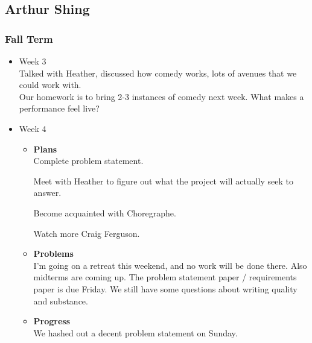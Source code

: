\subsection{Arthur Shing}
	\subsubsection{Fall Term}
	\begin{itemize}

		\item{Week 3} \\
		Talked with Heather, discussed how comedy works, lots of avenues that we could work with.\\
		Our homework is to bring 2-3 instances of comedy next week.
		What makes a performance feel live?
		\item{Week 4}
			\begin{itemize}
				\item \textbf{Plans} \\
				Complete problem statement.

Meet with Heather to figure out what the project will actually seek to answer.

Become acquainted with Choregraphe.

Watch more Craig Ferguson.
				\item \textbf{Problems} \\
I'm going on a retreat this weekend, and no work will be done there. Also midterms are coming up.
The problem statement paper / requirements paper is due Friday. We still have some questions about writing quality and substance.
				\item \textbf{Progress} \\
				We hashed out a decent problem statement on Sunday.
			\end{itemize}


\end{itemize}
